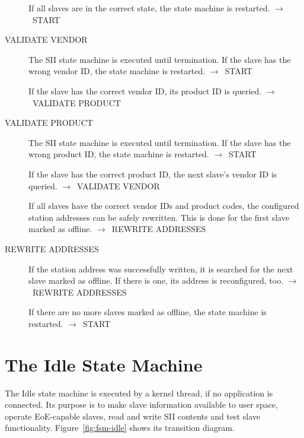 \documentclass[a4paper,12pt,BCOR6mm,bibtotoc,idxtotoc]{scrbook}
\begin{document}
\begin{description}
  If all slaves are in the correct state, the state machine is
  restarted. $\rightarrow$~START

\item[VALIDATE VENDOR] The SII state machine is executed until
  termination. If the slave has the wrong vendor ID, the state machine
  is restarted. $\rightarrow$~START

  If the slave has the correct vendor ID, its product ID is queried.
  $\rightarrow$~VALIDATE PRODUCT

\item[VALIDATE PRODUCT] The SII state machine is executed until
  termination. If the slave has the wrong product ID, the state
  machine is restarted. $\rightarrow$~START

  If the slave has the correct product ID, the next slave's vendor ID
  is queried. $\rightarrow$~VALIDATE VENDOR

  If all slaves have the correct vendor IDs and product codes, the
  configured station addresses can be safely rewritten. This is done
  for the first slave marked as offline.
  $\rightarrow$~REWRITE ADDRESSES

\item[REWRITE ADDRESSES] If the station address was successfully
  written, it is sear\-ched for the next slave marked as offline. If
  there is one, its address is reconfigured, too.
  $\rightarrow$~REWRITE ADDRESSES

  If there are no more slaves marked as offline, the state machine is
  restarted. $\rightarrow$~START
\end{description}


\section{The Idle State Machine}
\label{sec:fsm-idle}

The Idle state machine is executed by a kernel thread, if no application is
connected. Its purpose is to make slave information available to user space,
operate EoE-capable slaves, read and write SII contents and test slave
functionality.  Figure~\ref{fig:fsm-idle} shows its transition diagram.
\end{document}
